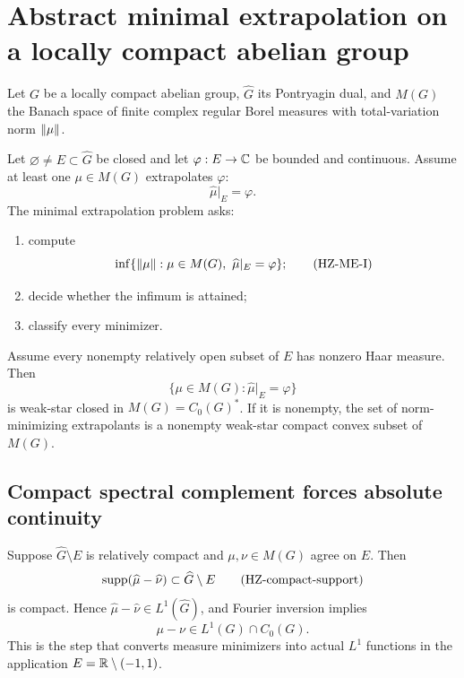\section{Abstract minimal extrapolation on a locally compact abelian group}


Let $G$ be a locally compact abelian group, $\widehat G$ its Pontryagin dual, and $M(G)$ the Banach space of finite complex regular Borel measures with total-variation norm $\left\lVert \mu\right\rVert$.

Let $\varnothing\ne E\subset\widehat G$ be closed and let $\varphi:E\to\mathbb{C}$ be bounded and continuous. Assume at least one $\mu\in M(G)$ extrapolates $\varphi$:
\[
  \widehat\mu|_E=\varphi.
\]
The minimal extrapolation problem asks:
\begin{enumerate}[label=(\Roman*)]
\item compute
\[
  \inf\{\norm\mu:\mu\in M(G),\ \widehat\mu|_E=\varphi\};
  \tag{HZ-ME-I}\label{HZ-ME-I}
\]
\item decide whether the infimum is attained;
\item classify every minimizer.
\end{enumerate}

\begin{theorem}
Assume every nonempty relatively open subset of $E$ has nonzero Haar measure. Then
\[
  \{\mu\in M(G):\widehat\mu|_E=\varphi\}
  \tag{HZ-feasible}\label{HZ-feasible}
\]
is weak-star closed in $M(G)=C_0(G)^*$. If it is nonempty, the set of norm-minimizing extrapolants is a nonempty weak-star compact convex subset of $M(G)$.
\end{theorem}

\subsection{Compact spectral complement forces absolute continuity}

Suppose $\widehat G\setminus E$ is relatively compact and $\mu,\nu\in M(G)$ agree on $E$. Then
\[
  \operatorname{supp}(\widehat\mu-\widehat\nu)
  \subset\widehat G\setminus E
  \tag{HZ-compact-support}\label{HZ-compact-support}
\]
is compact. Hence $\widehat\mu-\widehat\nu\in L^1(\widehat G)$, and Fourier inversion implies
\[
  \mu-\nu\in L^1(G)\cap C_0(G).
  \tag{HZ-ac-difference}\label{HZ-ac-difference}
\]
This is the step that converts measure minimizers into actual $L^1$ functions in the application $E=\mathbb{R}\setminus(-1,1)$.

